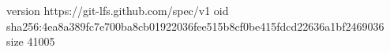 version https://git-lfs.github.com/spec/v1
oid sha256:4ea8a389fc7e700ba8cb01922036fee515b8cf0be415fdcd22636a1bf2469036
size 41005
